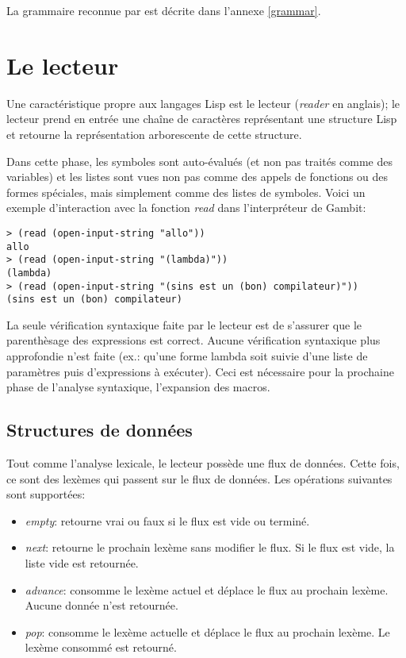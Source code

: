 \documentclass[11pt]{report}
\begin{document}
La grammaire reconnue par \sins{} est décrite dans l'annexe
\ref{grammar}.


\section{Le lecteur}

Une caractéristique propre aux langages Lisp est le lecteur
(\emph{reader} en anglais); le lecteur prend en entrée une chaîne de
caractères représentant une structure Lisp et retourne la
représentation arborescente de cette structure.

Dans cette phase, les symboles sont auto-évalués (et non pas traités
comme des variables) et les listes sont vues non pas comme des appels
de fonctions ou des formes spéciales, mais simplement comme des listes
de symboles.  Voici un exemple d'interaction avec la fonction
\emph{read} dans l'interpréteur de Gambit:

\begin{verbatim}
> (read (open-input-string "allo"))
allo
> (read (open-input-string "(lambda)"))
(lambda)
> (read (open-input-string "(sins est un (bon) compilateur)"))
(sins est un (bon) compilateur)
\end{verbatim}

La seule vérification syntaxique faite par le lecteur est de s'assurer
que le parenthèsage des expressions est correct.  Aucune vérification
syntaxique plus approfondie n'est faite (ex.: qu'une forme lambda soit
suivie d'une liste de paramètres puis d'expressions à exécuter).  Ceci
est nécessaire pour la prochaine phase de l'analyse syntaxique,
l'expansion des macros.

\subsection{Structures de données}

Tout comme l'analyse lexicale, le lecteur possède une flux de
données.  Cette fois, ce sont des lexèmes qui passent sur le flux de
données.  Les opérations suivantes sont supportées:

\begin{itemize}
\item \emph{empty}: retourne vrai ou faux si le flux est vide ou terminé.
\item \emph{next}: retourne le prochain lexème sans modifier le flux.
  Si le flux est vide, la liste vide est retournée.
\item \emph{advance}: consomme le lexème actuel et déplace le flux au
  prochain lexème.  Aucune donnée n'est retournée.
\item \emph{pop}: consomme le lexème actuelle et déplace le flux au
  prochain lexème.  Le lexème consommé est retourné.
\end{itemize}
\end{document}
